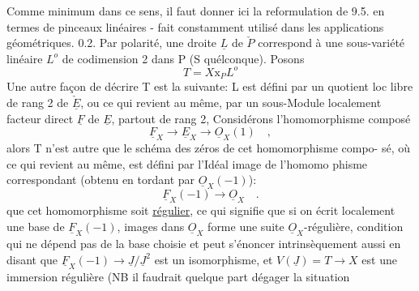 
Comme minimum dans ce sens, il faut  donner ici la reformulation de 9.5.
en termes de pinceaux linéaires  -  fait constamment utilisé dans les
applications géométriques.
0.2.  Par polarité, une droite $\underline{L}$  de $\check{P}$  correspond à une sous-variété
linéaire $L^{o}$ de codimension 2 dans P  (S quélconque).  Posons
\[ T = X\mathrm{x}_{P}L^{o} \]
Une autre façon  de décrire T est la suivante:  L  est défini par un
quotient loc libre de rang 2 de $\check{\underline{E}}$, ou ce qui revient au même, par un
sous-Module localement facteur direct  $\underline{F}$ de $\underline{E}$, partout de rang 2,
Considérons  l'homomorphisme composé
\[ \underline{F}_{X} \longrightarrow \underline{E}_{X} \longrightarrow \underline{O}_{X}(1) \quad , \]
alors  T n'est autre que  le schéma des zéros de cet homomorphisme compo-%
sé, où ce qui revient au même, est défini par l'Idéal  image de l'homomo%
phisme correspondant (obtenu en tordant par $\underline{O}_{X}(-1)$):
\[ \underline{F}_{X}(-1) \longrightarrow \underline{O}_{X} \quad . \]
 que cet homomorphisme soit \uline{régulier}, ce qui signifie
que  si on écrit localement une base  de $\underline{F}_{X}(-1)$,   images dans $\underline{O}_{X}$\hand{\unsure{\^{}}}
forme une suite $\underline{O}_{X}$-régulière, condition qui ne dépend pas de la base
choisie et peut s'énoncer intrinsèquement aussi en disant que
$\underline{F}_{X}(-1)$$\to \underline{J}/\underline{J}^{2}$  est un isomorphisme, et  $V(\underline{J})=T \longrightarrow X$  est  une immersion
 régulière  (NB il  faudrait quelque part dégager la situation
